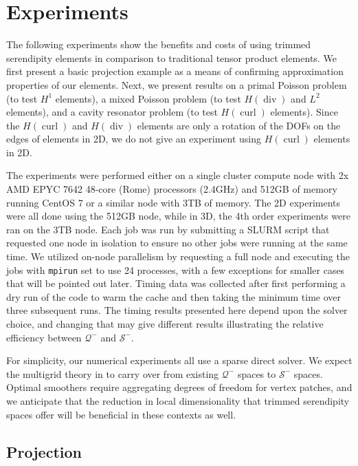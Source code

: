 \documentclass[format=acmsmall,screen,timestamp=false,a4paper]{acmart}
\DeclareMathOperator{\Div}{div}
\DeclareMathOperator{\curl}{curl}
\newcommand{\hcurl}{\ensuremath{{H}(\curl)}\xspace}
\newcommand{\hdiv}{\ensuremath{{H}(\Div)}\xspace}
\begin{document}
  \section{Experiments}
    
The following experiments show the benefits and costs of using trimmed serendipity elements in comparison to traditional tensor product elements.  We first present a basic projection example as a means of confirming approximation properties of our elements.  Next, we present results on a primal Poisson problem (to test $H^1$ elements), a mixed Poisson problem (to test \hdiv and $L^2$ elements), and a cavity resonator problem (to test \hcurl elements).  Since the \hcurl and \hdiv elements are only a rotation of the DOFs on the edges of elements in 2D, we do not give an experiment using \hcurl elements in 2D. 

The experiments were performed either on a single cluster compute node with 2x AMD EPYC 7642 48-core (Rome) processors (2.4GHz) and 512GB of memory running CentOS 7 or a similar node with 3TB of memory.  The 2D experiments were all done using the 512GB node, while in 3D, the 4th order experiments were ran on the 3TB node.  Each job was run by submitting a SLURM script that requested one node in isolation to ensure no other jobs were running at the same time.  We utilized on-node parallelism by requesting a full node and executing the jobs with \texttt{mpirun} set to use 24 processes, with a few exceptions for smaller cases that will be pointed out later.  Timing data was collected after first performing a dry run of the code to warm the cache and then taking the minimum time over three subsequent runs.  The timing results presented here depend upon the solver choice, and changing that may give different results illustrating the relative efficiency between $\mathcal{Q}^-$ and $\mathcal{S}^-$.  

For simplicity, our numerical experiments all use a sparse direct solver.  We expect the multigrid theory in \citet{AFW2000,AFW2006} to carry over from existing $\mathcal{Q}^-$ spaces to $\mathcal{S}^-$ spaces.  Optimal smoothers require aggregating degrees of freedom for vertex patches, and we anticipate that the reduction in local dimensionality that trimmed serendipity spaces offer will be beneficial in these contexts as well.

\subsection{Projection}
  
\end{document}
